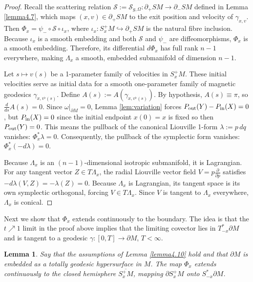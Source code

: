 \documentclass[12pt]{amsart}
\numberwithin{equation}{section}
\newtheorem{lemma}[theorem]{Lemma}
\begin{document}
\begin{proof}
Recall the scattering relation $\mathcal S:=\mathcal{S}_{g,\Omega}: \partial_+ SM \to \partial_- SM$ defined in Lemma \ref{lemma4.7}, which maps $(x,v)\in\partial_+SM$ to the exit position and velocity of $\gamma_{x,v}$. Then $\Phi_x= \psi_- \circ \mathcal{S} \circ \iota_x$, where $\iota_x : S_x^+ M \hookrightarrow \partial_+ SM$ is the natural fibre inclusion. Because $\iota_x$ is a smooth embedding and both $\mathcal{S}$ and $\psi_-$ are diffeomorphisms, $\Phi_x$ is a smooth embedding. Therefore, its differential $d\Phi_x$ has full rank $n-1$ everywhere, making $\Lambda_x$ a smooth, embedded submanifold of dimension $n-1$.

Let $s \mapsto v(s)$ be a 1-parameter family of velocities in $S_x^+ M$. These initial velocities serve as initial data for a smooth one-parameter family of magnetic geodesics $\gamma_{x,v^{\flat}(s)}$. Define $A(s):=A(\gamma_{x,v^{\flat}(s)})$. By hypothesis, $A(s) \equiv \pi$, so $\frac{d}{ds} A(s) = 0$.
Since $\omega\vert_{\partial M}=0$, Lemma \ref{lem:variation} forces $P_{\rm out}(Y)-P_{\rm in}(X) = 0$, but $P_{\rm in}(X) = 0$ since the initial endpoint $x(0)=x$ is fixed so then $P_{\rm out}(Y)=0$. This means the pullback of the canonical Liouville 1-form $\lambda := p\,dq$ vanishes: $\Phi_x^*\lambda = 0$. Consequently, the pullback of the symplectic form vanishes: $\Phi_x^*(-d\lambda) = 0$.

Because $\Lambda_x$ is an $(n-1)$-dimensional isotropic submanifold, it is Lagrangian. For any tangent vector $Z \in T\Lambda_x$, the radial Liouville vector field $V = p \frac{\partial}{\partial p}$ satisfies $-d\lambda(V, Z) = -\lambda(Z) = 0$. Because $\Lambda_x$ is Lagrangian, its tangent space is its own symplectic orthogonal, forcing $V \in T\Lambda_x$. Since $V$ is tangent to $\Lambda_x$ everywhere, $\Lambda_x$ is conical.
\end{proof}

Next we show that $\Phi_x$ extends continuously to the boundary. The idea is that the $t\nearrow 1$ limit in the proof above implies that the limiting covector lies in $T_{-x}^*\partial M$ and is tangent to a geodesic $\gamma:[0,T]\to \partial M$, $T<\infty$.

\begin{lemma} \label{lem:extension}
Say that the assumptions of Lemma \ref{lemma4.10} hold and that $\partial M$ is embedded as a totally geodesic hypersurface in $M$. The map $\Phi_x$ extends continuously to the closed hemisphere $\overline{S_x^+ M}$, mapping  $\partial S_x^+ M$ onto $S_{-x}^*\partial M$.
\label{lemma4.11}
\end{lemma}
\end{document}
